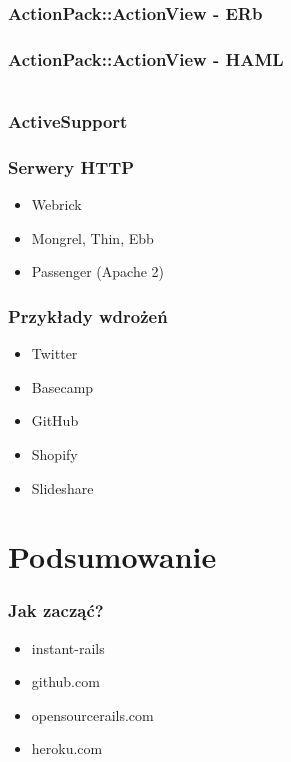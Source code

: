 \documentclass[12t]{beamer}
\begin{document}
\begin{frame}[fragile]
  \frametitle{ActionPack::ActionView - ERb}
  
\end{frame}

\begin{frame}[fragile]
  \frametitle{ActionPack::ActionView - HAML}
  \begin{footnotesize}
  \begin{columns}[T]
    \begin{column}{4cm}
      
    \end{column}
    \begin{column}{6cm}
      
    \end{column}
  \end{columns}
  \end{footnotesize}
\end{frame}

\begin{frame}
  \frametitle{ActiveSupport}
  
\end{frame}

\begin{frame}
  \frametitle{Serwery HTTP}
  \begin{itemize}
  \item Webrick
  \item Mongrel, Thin, Ebb
  \item Passenger (Apache 2)
  \end{itemize}
\end{frame}

\begin{frame}
  \frametitle{Przykłady wdrożeń}
  \begin{itemize}
  \item Twitter
  \item Basecamp
  \item GitHub
  \item Shopify
  \item Slideshare
  \end{itemize}
\end{frame}

\section{Podsumowanie}
\begin{frame}
  \frametitle{Jak zacząć?}
  \begin{itemize}
  \item instant-rails
  \item github.com
  \item opensourcerails.com
  \item heroku.com
  \end{itemize}
\end{frame}
\end{document}
